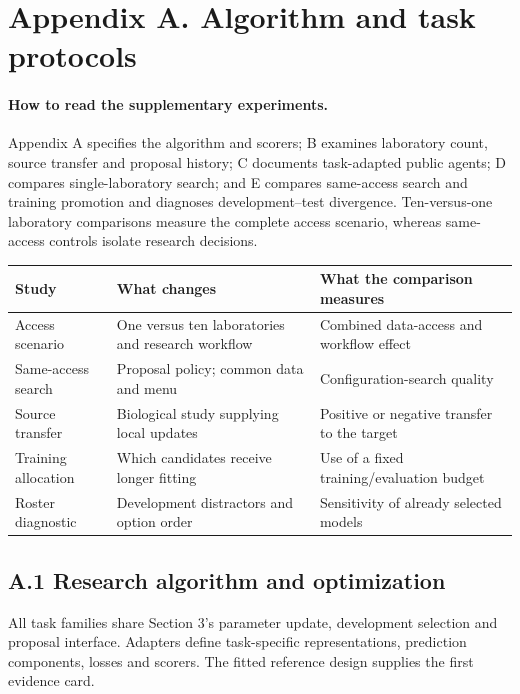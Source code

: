 \section*{Appendix A. Algorithm and task protocols}
\label{app:unified}
\setcounter{table}{0}
\renewcommand{\thetable}{A.\arabic{table}}
\renewcommand{\theHtable}{A.\arabic{table}}

\paragraph{How to read the supplementary experiments.}
Appendix A specifies the algorithm and scorers; B examines laboratory count, source transfer and proposal history; C documents task-adapted public agents; D compares single-laboratory search; and E compares same-access search and training promotion and diagnoses development--test divergence. Ten-versus-one laboratory comparisons measure the complete access scenario, whereas same-access controls isolate research decisions.

\begin{center}\small
\begin{tabularx}{\linewidth}{@{}lXX@{}}
\toprule
Study & What changes & What the comparison measures \\
\midrule
Access scenario & One versus ten laboratories and research workflow & Combined data-access and workflow effect \\
Same-access search & Proposal policy; common data and menu & Configuration-search quality \\
Source transfer & Biological study supplying local updates & Positive or negative transfer to the target \\
Training allocation & Which candidates receive longer fitting & Use of a fixed training/evaluation budget \\
Roster diagnostic & Development distractors and option order & Sensitivity of already selected models \\
\bottomrule
\end{tabularx}
\end{center}

\subsection*{A.1 Research algorithm and optimization}
All task families share Section 3's parameter update, development selection and proposal interface. Adapters define task-specific representations, prediction components, losses and scorers. The fitted reference design supplies the first evidence card.

